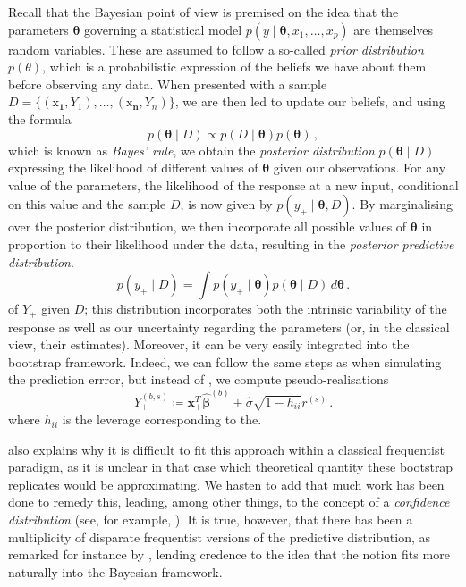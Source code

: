 \documentclass[a4paper]{book}
\begin{document}
Recall that the Bayesian point of view is premised on the idea that the parameters $\bm{\theta}$ governing a statistical model $p(y \mid \bm{\theta}, x_1, \dots, x_p)$ are themselves random variables. These are assumed to follow a so-called \emph{prior distribution} $p(\theta)$, which is a probabilistic expression of the beliefs we have about them before observing any data. When presented with a sample $D = \{ (\bm{\mathrm{x}_1}, Y_1), \dots, (\bm{\mathrm{x}_n}, Y_n) \}$, we are then led to update our beliefs, and using the formula
\begin{equation}
  p(\bm{\theta} \mid D) \propto p(D \mid \bm{\theta}) p(\bm{\theta}) \,,
\end{equation}
which is known as \emph{Bayes' rule}, we obtain the \emph{posterior distribution} $p(\bm{\theta} \mid D)$ expressing the likelihood of different values of $\bm{\theta}$ given our observations. For any value of the parameters, the likelihood of the response at a new input, conditional on this value and the sample $D$, is now given by $p(y_+ \mid \bm{\theta}, D)$. By marginalising over the posterior distribution, we then incorporate all possible values of $\bm{\theta}$ in proportion to their likelihood under the data, resulting in the \emph{posterior predictive distribution}.
\begin{equation}
  p(y_+ \mid D) = \int p(y_+ \mid \bm{\theta}) p(\bm{\theta} \mid D) \, d \bm{\theta} \,.
\end{equation}
of $Y_+$ given $D$; this distribution incorporates both the intrinsic variability of the response as well as our uncertainty regarding the parameters (or, in the classical view, their estimates). Moreover, it can be very easily integrated into the bootstrap framework. Indeed, we can follow the same steps as when simulating the prediction errror, but instead of , we compute pseudo-realisations
\begin{equation} \label{eq:pred-dist}
  Y_+^{(b, s)} \coloneqq \mathbf{x}_+^T \widehat{\bm{\beta}}^{(b)} + \widehat{\sigma} \sqrt{1 - h_{ii}} r^{(s)} \,.
\end{equation}
where $h_{ii}$ is the leverage corresponding to the. 

 also explains why it is difficult to fit this approach within a classical frequentist paradigm, as it is unclear in that case which theoretical quantity these bootstrap replicates would be approximating. We hasten to add that much work has been done to remedy this, leading, among other things, to the concept of a \emph{confidence distribution} (see, for example, \cites{barndorff-nielsen,lawless}). It is true, however, that there has been a multiplicity of disparate frequentist versions of the predictive distribution, as remarked for instance by \textcite{dickson}, lending credence to the idea that the notion fits more naturally into the Bayesian framework.
\end{document}

